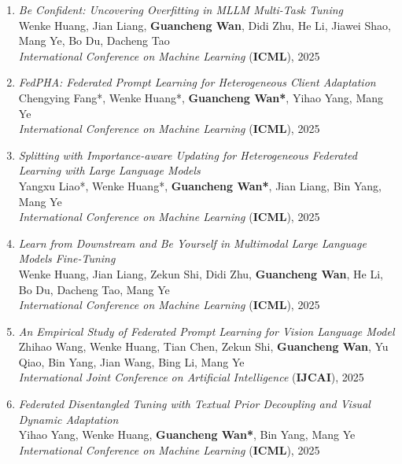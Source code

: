 \begin{enumerate}
    \item \textit{Be Confident: Uncovering Overfitting in MLLM Multi-Task Tuning} \\
    Wenke Huang, Jian Liang, \textbf{Guancheng Wan}, Didi Zhu, He Li, Jiawei Shao, Mang Ye, Bo Du, Dacheng Tao \\
    \hfill \textit{International Conference on Machine Learning} (\textbf{ICML}), 2025

    \item \textit{FedPHA: Federated Prompt Learning for Heterogeneous Client Adaptation} \\
    Chengying Fang*, Wenke Huang*, \textbf{Guancheng Wan*}, Yihao Yang, Mang Ye \\
    \hfill \textit{International Conference on Machine Learning} (\textbf{ICML}), 2025

    \item \textit{Splitting with Importance-aware Updating for Heterogeneous Federated Learning with Large Language Models} \\
    Yangxu Liao*, Wenke Huang*, \textbf{Guancheng Wan*}, Jian Liang, Bin Yang, Mang Ye \\
    \hfill \textit{International Conference on Machine Learning} (\textbf{ICML}), 2025

    \item \textit{Learn from Downstream and Be Yourself in Multimodal Large Language Models Fine-Tuning} \\
    Wenke Huang, Jian Liang, Zekun Shi, Didi Zhu, \textbf{Guancheng Wan}, He Li, Bo Du, Dacheng Tao, Mang Ye \\
    \hfill \textit{International Conference on Machine Learning} (\textbf{ICML}), 2025

    \item \textit{An Empirical Study of Federated Prompt Learning for Vision Language Model} \\
    Zhihao Wang, Wenke Huang, Tian Chen, Zekun Shi, \textbf{Guancheng Wan}, Yu Qiao, Bin Yang, Jian Wang, Bing Li, Mang Ye \\
    \hfill \textit{International Joint Conference on Artificial Intelligence} (\textbf{IJCAI}), 2025

    \item \textit{Federated Disentangled Tuning with Textual Prior Decoupling and Visual Dynamic Adaptation} \\
    Yihao Yang, Wenke Huang, \textbf{Guancheng Wan*}, Bin Yang, Mang Ye \\
    \hfill \textit{International Conference on Machine Learning} (\textbf{ICML}), 2025


\end{enumerate}
